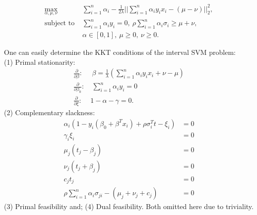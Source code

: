 \documentclass[10pt]{article}
\theoremstyle{definition}
\begin{document}
\begin{align}
\label{eq:dual}
\max_{\alpha,\mu,\nu} & \sum_{i=1}^n \alpha_i - \frac{1}{2\lambda}||\sum_{i=1}^n \alpha_iy_i x_i - (\mu-\nu)||_2^2, \\
\text{subject to } & \sum_{i=1}^n \alpha_i y_i = 0, \ \rho \sum_{i=1}^n \alpha_i \sigma_{i} \geq \mu + \nu, \nonumber \\
& \alpha \in [0,1], \ \mu\geq0, \ \nu\geq0. \nonumber
\end{align}


One can easily determine the KKT conditions of the interval SVM problem:\\
(1) Primal stationarity:
\begin{align}
\frac{\partial}{\partial \beta}: & \ \beta = \frac{1}{\lambda}(\sum_{i=1}^n \alpha_i y_i x_i + \nu-\mu) \\ 
\frac{\partial}{\partial \beta_0}: & \ \sum_{i=1}^n \alpha_i y_i = 0\\
\frac{\partial}{\partial \xi}: & 1-\alpha - \gamma =0.
\end{align}
(2) Complementary slackness:
\begin{align}
\alpha_i(1 - y_i(\beta_0+\beta^Tx_i)+\rho \sigma_i^Tt-\xi_i) & = 0 \\
\gamma_i\xi_i & = 0 \\
\mu_j(t_j-\beta_j) & = 0 \\
\nu_j(t_j+\beta_j) & = 0 \\
c_jt_j & = 0 \\
\rho \sum_{i=1}^n \alpha_i \sigma_{ji} - (\mu_j +\nu_j+c_j) & =0 
\end{align}
(3) Primal feasibility and; (4) Dual feasibility. Both omitted here due to triviality.\\
\end{document}
